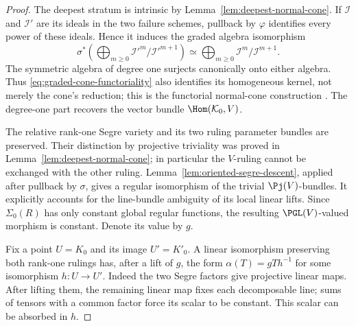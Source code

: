 \begin{proof}
The deepest stratum is intrinsic by
Lemma~\ref{lem:deepest-normal-cone}.  If \(\mathcal I\) and
\(\mathcal I'\) are its ideals in the two failure schemes, pullback
by \(\varphi\) identifies every power of these ideals.  Hence it
induces the graded algebra isomorphism
\begin{equation}\label{eq:graded-cone-functoriality}
 \sigma^*\!\left(\bigoplus_{m\ge0}
                  \mathcal I'^m/\mathcal I'^{m+1}\right)
       \simeq \bigoplus_{m\ge0}\mathcal I^m/\mathcal I^{m+1}.
\end{equation}
The symmetric algebra of degree one surjects canonically onto either
algebra.  Thus \eqref{eq:graded-cone-functoriality} also identifies
its homogeneous kernel, not merely the cone's reduction; this is the
functorial normal-cone construction \cite{StacksNormalCone}.
The degree-one part recovers the vector bundle
\(\Hom(\mathcal K_0,V)\).

The relative rank-one Segre variety and its two ruling parameter
bundles are preserved.  Their distinction by projective triviality
was proved in Lemma~\ref{lem:deepest-normal-cone}; in particular the
\(V\)-ruling cannot be exchanged with the other ruling.  Lemma~\ref{lem:oriented-segre-descent}, applied after
pullback by \(\sigma\), gives a regular isomorphism of the
trivial \(\Pj(V)\)-bundles.  It explicitly accounts for the
line-bundle ambiguity of its local linear lifts.  Since
\(\Sigma_0(R)\) has only constant global regular functions,
the resulting \(\PGL(V)\)-valued morphism is constant.
Denote its value by \(g\).

Fix a point \(U=K_0\) and its image \(U'=K'_0\).  A linear
isomorphism preserving both rank-one rulings has, after a lift of
\(g\), the form
\(\alpha(T)=gTh^{-1}\) for some isomorphism \(h:U\to U'\).
Indeed the two Segre factors give projective linear maps.  After
lifting them, the remaining linear map fixes each decomposable line;
sums of tensors with a common factor force its scalar to be constant.
This scalar can be absorbed in \(h\).


\end{proof}
